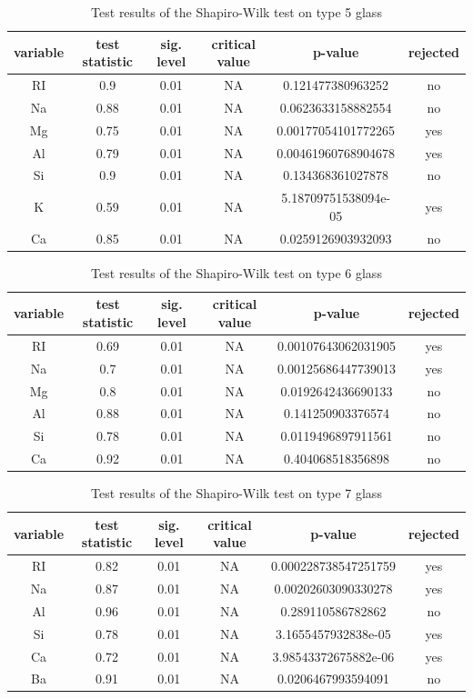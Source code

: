 \documentclass[a4paper, 12pt, titlepage, headsepline, listof = totoc, bibliography = totoc, numbers = noenddot]{scrartcl}
\begin{document}
\begin{table}[h!]
\centering
\begin{tabular}{|cccccc|} \hline variable & test statistic & sig. level & critical value & p-value & rejected\\ \hline RI & 0.9 & 0.01 & NA & 0.121477380963252 & no\\ 
Na & 0.88 & 0.01 & NA & 0.0623633158882554 & no\\ 
Mg & 0.75 & 0.01 & NA & 0.00177054101772265 & yes\\ 
Al & 0.79 & 0.01 & NA & 0.00461960768904678 & yes\\ 
Si & 0.9 & 0.01 & NA & 0.134368361027878 & no\\ 
K & 0.59 & 0.01 & NA & 5.18709751538094e-05 & yes\\ 
Ca & 0.85 & 0.01 & NA & 0.0259126903932093 & no\\ \hline \end{tabular}\caption{Test results of the Shapiro-Wilk test on type 5 glass}
\label{tab:testrestype5SW}
\end{table}

\begin{table}[h!]
\centering
\begin{tabular}{|cccccc|} \hline variable & test statistic & sig. level & critical value & p-value & rejected\\ \hline RI & 0.69 & 0.01 & NA & 0.00107643062031905 & yes\\ 
Na & 0.7 & 0.01 & NA & 0.00125686447739013 & yes\\ 
Mg & 0.8 & 0.01 & NA & 0.0192642436690133 & no\\ 
Al & 0.88 & 0.01 & NA & 0.141250903376574 & no\\ 
Si & 0.78 & 0.01 & NA & 0.0119496897911561 & no\\ 
Ca & 0.92 & 0.01 & NA & 0.404068518356898 & no\\ \hline \end{tabular}\caption{Test results of the Shapiro-Wilk test on type 6 glass}
\label{tab:testrestype6SW}
\end{table}

\begin{table}[h!]
\centering
\begin{tabular}{|cccccc|} \hline variable & test statistic & sig. level & critical value & p-value & rejected\\ \hline RI & 0.82 & 0.01 & NA & 0.000228738547251759 & yes\\ 
Na & 0.87 & 0.01 & NA & 0.00202603090330278 & yes\\ 
Al & 0.96 & 0.01 & NA & 0.289110586782862 & no\\ 
Si & 0.78 & 0.01 & NA & 3.1655457932838e-05 & yes\\ 
Ca & 0.72 & 0.01 & NA & 3.98543372675882e-06 & yes\\ 
Ba & 0.91 & 0.01 & NA & 0.0206467993594091 & no\\ \hline \end{tabular}\caption{Test results of the Shapiro-Wilk test on type 7 glass}
\label{tab:testrestype7SW}
\end{table}
\end{document}
